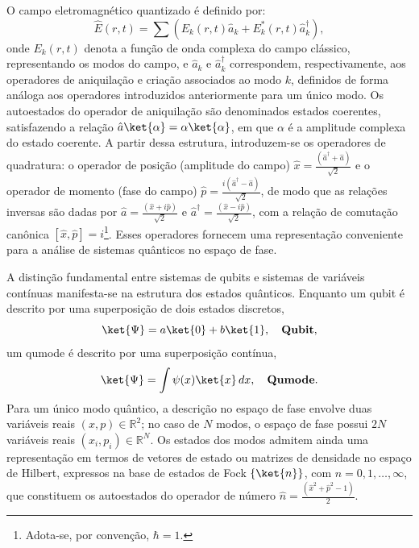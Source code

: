 O campo eletromagnético quantizado é definido por:
\begin{equation}
    \hat{E}(r,t) = \sum \left( E_k(r,t)\hat{a}_k + E_k^{*}(r,t)\hat{a}_k^{\dagger} \right),
\end{equation}
onde $E_k(r,t)$ denota a função de onda complexa do campo clássico, representando os modos do campo,  e $\hat{a}_k$ e $\hat{a}_k^{\dagger}$ 
correspondem, respectivamente, aos operadores de aniquilação e criação 
associados ao modo $k$, definidos de forma análoga aos operadores 
introduzidos anteriormente para um único modo. Os autoestados do operador de aniquilação são denominados estados coerentes, satisfazendo a relação $\hat{a}\ket{\alpha} = \alpha \ket{\alpha}$, em que $\alpha$ é a amplitude complexa do estado coerente. A partir dessa estrutura, introduzem-se os operadores de quadratura: o operador de posição (amplitude do campo) $\displaystyle\hat{x} = \frac{(\hat{a}^{\dagger} + \hat{a})}{\sqrt{2}}$ e o operador de momento (fase do campo) $\displaystyle\hat{p} = \frac{i(\hat{a}^{\dagger} - \hat{a})}{\sqrt{2}}$, de modo que as relações inversas são dadas por $\displaystyle\hat{a} = \frac{(\hat{x} + i\hat{p})}{\sqrt{2}}$ e $\displaystyle\hat{a}^{\dagger} = \frac{(\hat{x} - i\hat{p})}{\sqrt{2}}$, com a relação de comutação canônica $[\hat{x},\hat{p}] = i$\footnote{Adota-se, por convenção, $\hbar = 1$.}. Esses operadores fornecem uma representação conveniente para a análise de sistemas quânticos no espaço de fase.

A distinção fundamental entre sistemas de qubits e sistemas de variáveis contínuas manifesta-se na estrutura dos estados quânticos. Enquanto um qubit é descrito por uma superposição de dois estados discretos,
\begin{equation*}
    \ket{\Psi} = a\ket{0} + b\ket{1}, \quad \textbf{Qubit},
\end{equation*}
um qumode é descrito por uma superposição contínua,
\begin{equation*}
    \ket{\Psi} = \int \psi(x)\ket{x}\, dx, \quad \textbf{Qumode}.
\end{equation*}
Para um único modo quântico, a descrição no espaço de fase envolve duas variáveis reais $(x, p) \in \mathbb{R}^{2}$; no caso de $N$ modos, o espaço de fase possui $2N$ variáveis reais $(x_i, p_i) \in \mathbb{R}^{N}$. Os estados dos modos admitem ainda uma representação em termos de vetores de estado ou matrizes de densidade no espaço de Hilbert, expressos na base de estados de Fock $\{\ket{n}\}$, com $n = 0, 1, \ldots, \infty$, que constituem os autoestados do operador de número $\displaystyle\hat{n} = \frac{(\hat{x}^2 + \hat{p}^2 - 1)}{2}$.

